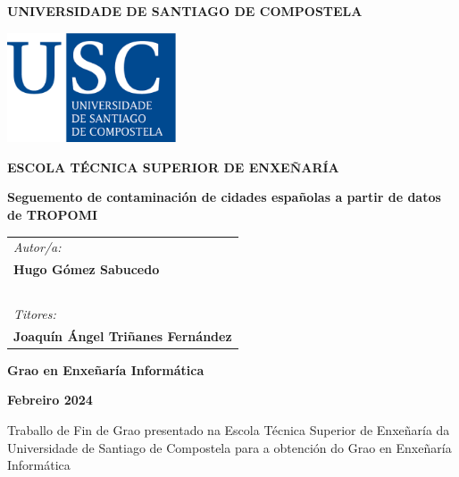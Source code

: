 \pagestyle{empty}
\begin{center}
	{\bf\Large UNIVERSIDADE DE SANTIAGO DE COMPOSTELA}
	
	\vspace{0.5cm}
	\includegraphics[width=5cm]{figuras/logo_usc.eps}
	
	\vspace{0.5cm}
	{\bf\large ESCOLA TÉCNICA SUPERIOR DE ENXEÑARÍA}
	
	\vspace{3cm}
	{\bf\LARGE Seguemento de contaminación de cidades españolas a partir de datos de TROPOMI}
	
\end{center}

\vspace{2cm}
\hspace{4cm}\begin{tabular}{l}
	{\it\Large Autor/a:} \\
	{\bf\Large Hugo Gómez Sabucedo} \\
	~ \\
	{\it\Large Titores:} \\
	{\bf\Large Joaquín Ángel Triñanes Fernández} \\
\end{tabular}

\vspace{2cm}
\begin{center}
	{\bf\Large Grao en Enxeñaría Informática}
	
	\vspace{0.5cm}
	{\bf\large Febreiro 2024}
	
	\vspace{0.5cm}
	Traballo de Fin de Grao presentado na Escola Técnica Superior de Enxeñaría da Universidade de Santiago de Compostela para a obtención do Grao en Enxeñaría Informática
\end{center}

